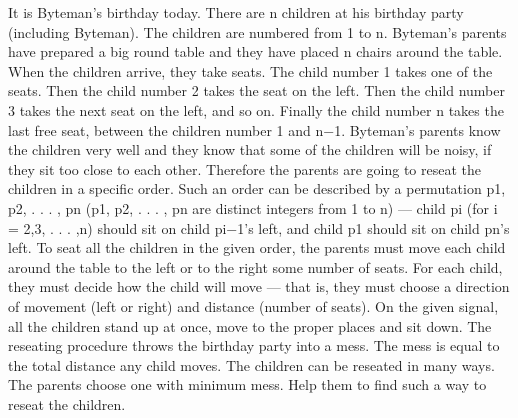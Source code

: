 It is Byteman’s birthday today. There are n children at his birthday party (including Byteman). The children are numbered from 1 to n. Byteman’s parents have prepared a big round table and they have placed n chairs around the table. When the children arrive, they take seats. The child number 1 takes one of the seats. Then the child number 2 takes the seat on the left. Then the child number 3 takes the next seat on the left, and so on. Finally the child number n takes the last free seat, between the children number 1 and n−1.  Byteman’s parents know the children very well and they know that some of the children will be noisy, if they sit too close to each other. Therefore the parents are going to reseat the children in a specific order. Such an order can be described by a permutation p1, p2, . . . , pn (p1, p2, . . . , pn are distinct integers from 1 to n) — child pi (for i = 2,3, . . . ,n) should sit on child pi−1’s left, and child p1 should sit on child pn’s left. To seat all the children in the given order, the parents must move each child around the table to the left or to the right some number of seats. For each child, they must decide how the child will move — that is, they must choose a direction of movement (left or right) and distance (number of seats). On the given signal, all the children stand up at once, move to the proper places and sit down. The reseating procedure throws the birthday party into a mess. The mess is equal to the total distance any child moves. The children can be reseated in many ways. The parents choose one with minimum mess. Help them to find such a way to reseat the children.